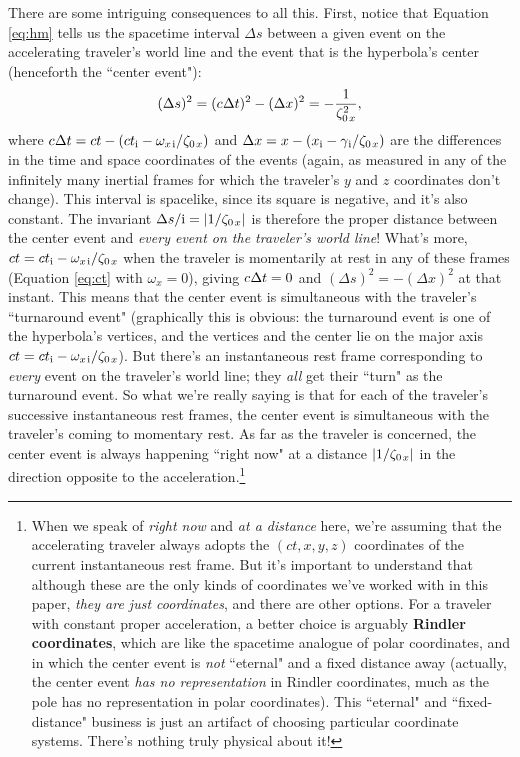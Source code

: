 \documentclass[12pt]{article}
\begin{document}
There are some intriguing consequences to all this. First, notice that Equation \ref{eq:hm} tells us the spacetime interval $\Delta s$ between a given event on the accelerating traveler's world line and the event that is the hyperbola's center (henceforth the ``center event"):
\begin{equation*}
(\Delta s)^2 = (c \mkern.5mu \Delta t)^2 - (\Delta x)^2 = - \dfrac{1}{ \zeta^2_{0 \mkern2mu x}},
\end{equation*}
where $c \mkern.5mu \Delta t = ct - (ct_{\mathrm{i}} - \omega_{x \mkern2mu \textrm{i} } / \zeta_{0 \mkern2mu x})$ and $\Delta x = x - (x_{\mathrm{i}} - \gamma_{\mkern1mu \mathrm{i}} / \zeta_{0 \mkern2mu x})$ are the differences in the time and space coordinates of the events (again, as measured in any of the infinitely many inertial frames for which the traveler's $y$ and $z$ coordinates don't change). This interval is spacelike, since its square is negative, and it's also constant. The invariant $\Delta s / \mathrm{i} = |1 / \zeta_{0 \mkern2mu x}|$ is therefore the proper distance between the center event and \emph{every event on the traveler's world line}! What's more, $ct = ct_{\mathrm{i}} - \omega_{x \mkern2mu \textrm{i} } / \zeta_{0 \mkern2mu x}$ when the traveler is momentarily at rest in any of these frames (Equation \ref{eq:ct} with $\omega_x = 0$), giving $c \mkern.5mu \Delta t = 0$ and $(\Delta s)^2 = - (\Delta x)^2$ at that instant. This means that the center event is simultaneous with the traveler's ``turnaround event" (graphically this is obvious: the turnaround event is one of the hyperbola's vertices, and the vertices and the center lie on the major axis $ct = ct_{\mathrm{i}} - \omega_{x \mkern2mu \textrm{i} } / \zeta_{0 \mkern2mu x}$). But there's an instantaneous rest frame corresponding to \emph{every} event on the traveler's world line; they \emph{all} get their ``turn" as the turnaround event. So what we're really saying is that for each of the traveler's successive instantaneous rest frames, the center event is simultaneous with the traveler's coming to momentary rest. As far as the traveler is concerned, the center event is always happening ``right now" at a distance $|1 / \zeta_{0 \mkern2mu x}|$ in the direction opposite to the acceleration.\footnote{When we speak of \emph{right now} and \emph{at a distance} here, we're assuming that the accelerating traveler always adopts the $(ct, x, y, z)$ coordinates of the current instantaneous rest frame. But it's important to understand that although these are the only kinds of coordinates we've worked with in this paper, \emph{they are just coordinates}, and there are other options. For a traveler with constant proper acceleration, a better choice is arguably \textbf{Rindler coordinates}, which are like the spacetime analogue of polar coordinates, and in which the center event is \emph{not} ``eternal" and a fixed distance away (actually, the center event \emph{has no representation} in Rindler coordinates, much as the pole has no representation in polar coordinates). This ``eternal" and ``fixed-distance" business is just an artifact of choosing particular coordinate systems. There's nothing truly physical about it!}
\end{document}
